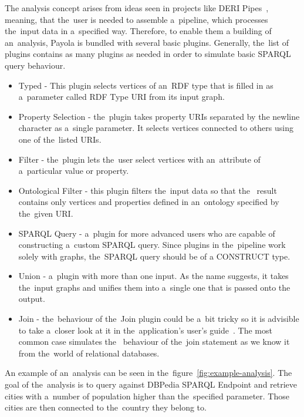 The analysis concept arises from ideas seen in projects like DERI 
Pipes~\cite{deri-pipes}, meaning, that the~user is needed to assemble a~pipeline,
which processes the~input data in a~specified way. Therefore, to enable them a 
building of an~analysis, Payola is bundled with several basic 
plugins. Generally, the~list of plugins contains as many plugins as needed
in order to simulate basic SPARQL query behaviour.

\begin{itemize}
  \item Typed - This plugin selects vertices of an~RDF type that is filled in
  as a~parameter called RDF Type URI from its input graph.
  
  \item Property Selection - the~plugin takes property URIs separated by the
  newline character as a~single parameter. It selects vertices connected
  to others using one of the~listed URIs.
  
  \item Filter - the~plugin lets the~user select vertices with an~attribute of
  a~particular value or property.
 
  \item Ontological Filter - this plugin filters the~input data so that the~
  result contains only vertices and properties defined in an~ontology specified 
  by the~given URI.
  
  \item SPARQL Query - a~plugin for more advanced users who are capable of 
  constructing a~custom SPARQL query. Since plugins in the~pipeline work solely with 
  graphs, the~SPARQL query should be of a CONSTRUCT type.
  
  \item Union - a~plugin with more than one input. As the name suggests, it takes 
  the~input graphs and unifies them into a~single one that is passed onto the~
  output.
  
  \item Join - the~behaviour of the~Join plugin could be a~bit tricky so it is advisible
  to take a~closer look at it in the~application's 
  user's guide~\cite{payola:ug:join-plugin}. The most common case simulates the~
  behaviour of the~join statement as we know it from the~world of relational 
  databases.
  
\end{itemize}

An example of an~analysis can be seen in the~figure~\ref{fig:example-analysis}.
The goal of the~analysis is to query against DBPedia SPARQL Endpoint and 
retrieve cities with a~number of population higher than the~specified parameter. 
Those cities are then connected to the~country they belong to.

